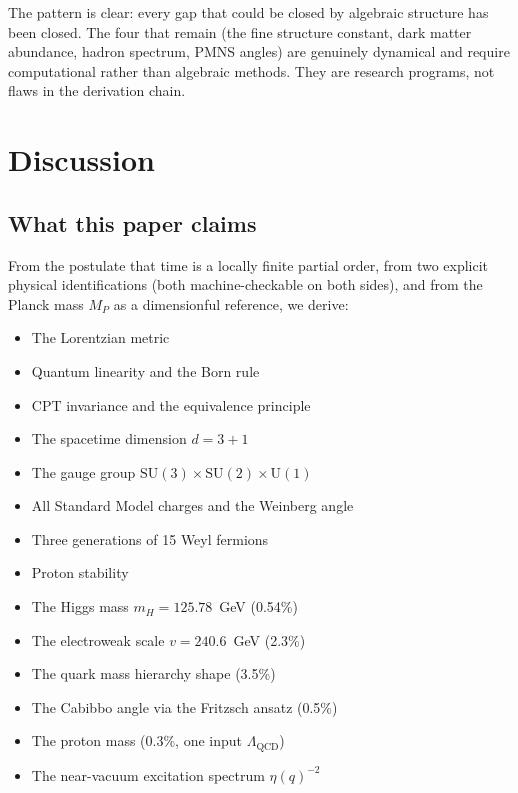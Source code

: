 \documentclass[11pt,letterpaper]{article}
\theoremstyle{remark}
\begin{document}
The pattern is clear: every gap that could be closed by algebraic
structure has been closed. The four that remain (the fine structure
constant, dark matter abundance, hadron spectrum, PMNS angles) are
genuinely dynamical and require computational rather than algebraic
methods. They are research programs, not flaws in the derivation
chain.

\section{Discussion}
\label{sec:discussion}

\subsection{What this paper claims}

From the postulate that time is a locally finite partial order, from
two explicit physical identifications (both machine-checkable on
both sides), and from the Planck mass $M_P$ as a dimensionful
reference, we derive:

\begin{itemize}[nosep]
  \item The Lorentzian metric
  \item Quantum linearity and the Born rule
  \item CPT invariance and the equivalence principle
  \item The spacetime dimension $d = 3{+}1$
  \item The gauge group
    $\mathrm{SU}(3) \times \mathrm{SU}(2) \times \mathrm{U}(1)$
  \item All Standard Model charges and the Weinberg angle
  \item Three generations of 15 Weyl fermions
  \item Proton stability
  \item The Higgs mass $m_H = 125.78$~GeV (0.54\%)
  \item The electroweak scale $v = 240.6$~GeV (2.3\%)
  \item The quark mass hierarchy shape (3.5\%)
  \item The Cabibbo angle via the Fritzsch ansatz (0.5\%)
  \item The proton mass (0.3\%, one input $\Lambda_{\mathrm{QCD}}$)
  \item The near-vacuum excitation spectrum $\eta(q)^{-2}$
\end{itemize}
\end{document}
